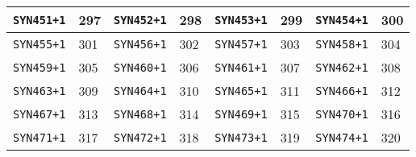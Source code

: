 \documentclass[./main.tex]{subfiles}
\begin{document}
\begin{table}[H]
\begin{tabularx}{\textwidth}{| X | X | X | X | X | X | X | X |}
\hline
\texttt{SYN451+1} & 297 & \texttt{SYN452+1} & 298 & \texttt{SYN453+1} & 299 & \texttt{SYN454+1} & 300\\
\hline
\texttt{SYN455+1} & 301 & \texttt{SYN456+1} & 302 & \texttt{SYN457+1} & 303 & \texttt{SYN458+1} & 304\\
\hline
\texttt{SYN459+1} & 305 & \texttt{SYN460+1} & 306 & \texttt{SYN461+1} & 307 & \texttt{SYN462+1} & 308\\
\hline
\texttt{SYN463+1} & 309 & \texttt{SYN464+1} & 310 & \texttt{SYN465+1} & 311 & \texttt{SYN466+1} & 312\\
\hline
\texttt{SYN467+1} & 313 & \texttt{SYN468+1} & 314 & \texttt{SYN469+1} & 315 & \texttt{SYN470+1} & 316\\
\hline
\texttt{SYN471+1} & 317 & \texttt{SYN472+1} & 318 & \texttt{SYN473+1} & 319 & \texttt{SYN474+1} & 320\\
\hline
\end{tabularx}
\end{table}
\end{document}
